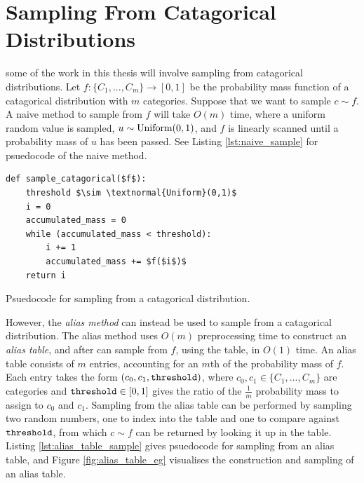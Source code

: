 \section{Sampling From Catagorical Distributions}
\label{sec:2-6-sampling}
    

    some of the work in this thesis will involve sampling from catagorical distributions. Let $f:\{C_1,...,C_m\}\rightarrow[0,1]$ be the probability mass function of a catagorical distribution with $m$ categories. Suppose that we want to sample $c\sim f$. A naive method to sample from $f$ will take $O(m)$ time, where a uniform random value is sampled, $u\sim\textnormal{Uniform}(0,1)$, and $f$ is linearly scanned until a probability mass of $u$ has been passed. See Listing \ref{lst:naive_sample} for psuedocode of the naive method.

    \begin{Listing}
        \begin{lstlisting}
def sample_catagorical($f$):
    threshold $\sim \textnormal{Uniform}(0,1)$
    i = 0
    accumulated_mass = 0
    while (accumulated_mass < threshold):
        i += 1
        accumulated_mass += $f($i$)$
    return i
        \end{lstlisting}
        \caption{Psuedocode for sampling from a catagorical distribution.}
        \label{lst:naive_sample}
    \end{Listing}

    However, the \textit{alias method}  can instead be used to sample from a catagorical distribution. The alias method uses $O(m)$ preprocessing time to construct an \textit{alias table}, and after can sample from $f$, using the table, in $O(1)$ time. An alias table consists of $m$ entries, accounting for an $m$th of the probability mass of $f$. Each entry takes the form $(c_0,c_1,{\texttt{threshold}})$, where $c_0,c_1\in\{C_1,...,C_m\}$ are categories and ${\texttt{threshold}}\in[0,1]$ gives the ratio of the $\frac{1}{m}$ probability mass to assign to $c_0$ and $c_1$. Sampling from the alias table can be performed by sampling two random numbers, one to index into the table and one to compare against ${\texttt{threshold}}$, from which $c\sim f$ can be returned by looking it up in the table. Listing \ref{lst:alias_table_sample} gives psuedocode for sampling from an alias table, and Figure \ref{fig:alias_table_eg} visualises the construction and sampling of an alias table.


